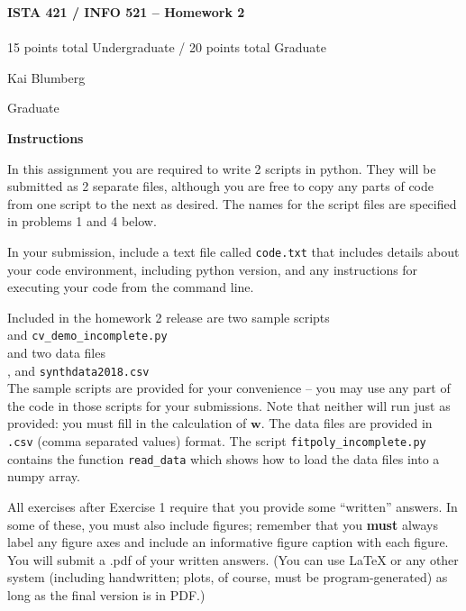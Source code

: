 \documentclass[10pt]{article}
\newcommand{\latex}{\LaTeX\xspace}
\begin{document}
\begin{center}
    {\Large {\bf ISTA 421 / INFO 521 -- Homework 2}} \\
     \\
    15 points total Undergraduate / 20 points total Graduate

\end{center}

\begin{flushright}
Kai Blumberg %

Graduate %
\end{flushright}


\vspace{1cm}
{\Large {\bf Instructions}}

In this assignment you are required to write 2 scripts in python.  They will be submitted as 2 separate files, although you are free to copy any parts of code from one script to the next as desired.  The names for the script files are specified in problems 1 and 4 below.

In your submission, include a text file called {\tt code.txt} that includes details about your code environment, including python version, and any instructions for executing your code from the command line.

Included in the homework 2 release are two sample scripts \\ 
\-\hspace{2cm}{\tt fitpoly\_incomplete.py} and {\tt cv\_demo\_incomplete.py} \\
and two data files\\
\-\hspace{2cm}{\tt womens100.csv}, and {\tt synthdata2018.csv}\\
The sample scripts are provided for your convenience -- you may use any part of the code in those scripts for your submissions.  Note that neither will run just as provided: you must fill in the calculation of $\mathbf{w}$.  The data files are provided in {\tt .csv} (comma separated values) format.  The script {\tt fitpoly\_incomplete.py} contains the function {\tt read\_data} which shows how to load the data files into a numpy array.

All exercises after Exercise 1 require that you provide some ``written'' answers.  In some of these, you must also include figures; remember that you {\bf must} always label any figure axes and include an informative figure caption with each figure.  You will submit a .pdf of your written answers.  (You can use \latex or any other system (including handwritten; plots, of course, must be program-generated) as long as the final version is in PDF.)
\end{document}
